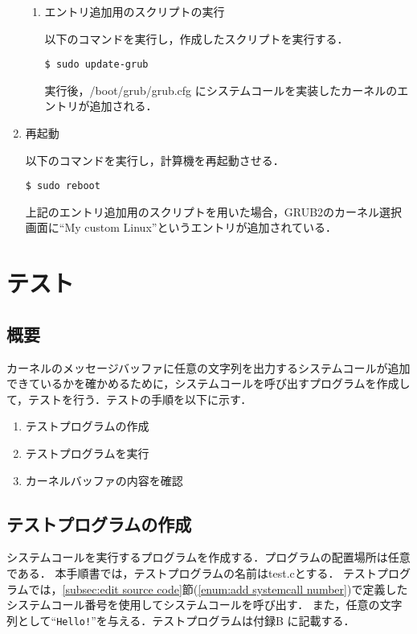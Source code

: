 \documentclass[12pt]{jsarticle}
\begin{document}
\begin{enumerate}
\begin{enumerate}
\item エントリ追加用のスクリプトの実行

以下のコマンドを実行し，作成したスクリプトを実行する．
\begin{verbatim}
$ sudo update-grub
\end{verbatim}
実行後，/boot/grub/grub.cfg にシステムコールを実装したカーネルのエントリが追加される．

\end{enumerate}

\item 再起動

以下のコマンドを実行し，計算機を再起動させる．
\begin{verbatim}
$ sudo reboot
\end{verbatim}

上記のエントリ追加用のスクリプトを用いた場合，GRUB2のカーネル選択画面に``My custom Linux''というエントリが追加されている．

\end{enumerate}

\section{テスト}\label{sec:test}
\subsection{概要}\label{subsec:abst}
カーネルのメッセージバッファに任意の文字列を出力するシステムコールが追加できているかを確かめるために，システムコールを呼び出すプログラムを作成して，テストを行う．テストの手順を以下に示す．
\begin{enumerate}
\item テストプログラムの作成 \label{enum:make test program}
\item テストプログラムを実行 \label{enum:execute test program}
\item カーネルバッファの内容を確認 \label{enum:check buffer}
\end{enumerate}

\subsection{テストプログラムの作成}\label{subsec:make test program}
システムコールを実行するプログラムを作成する．プログラムの配置場所は任意である．
本手順書では，テストプログラムの名前はtest.cとする．
テストプログラムでは，\ref{subsec:edit source code}節(\ref{enum:add systemcall number})で定義したシステムコール番号を使用してシステムコールを呼び出す．
また，任意の文字列として``\verb|Hello!|''を与える．テストプログラムは付録B
に記載する．
\end{document}
